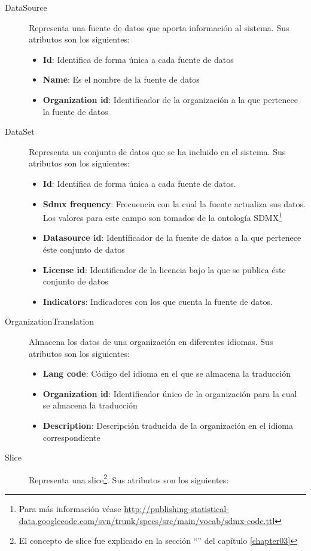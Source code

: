 \begin{description}
\begin{itemize}
		\end{itemize}
	\item[DataSource]  Representa una fuente de datos que aporta información al sistema.  Sus atributos son los siguientes:
		\begin{itemize}
			\item \textbf{Id}:  Identifica de forma única a cada fuente de datos
			\item \textbf{Name}:  Es el nombre de la fuente de datos
			\item \textbf{Organization id}:  Identificador de la organización a la que pertenece la fuente de datos
		\end{itemize}
	\item[DataSet]  Representa un conjunto de datos que se ha incluido en el sistema.  Sus atributos son los siguientes:
		\begin{itemize}
			\item \textbf{Id}:  Identifica de forma única a cada fuente de datos.
			\item \textbf{Sdmx frequency}:  Frecuencia con la cual la fuente actualiza sus datos.  Los valores para este campo son tomados de la ontología SDMX\footnote{Para más información véase \url{http://publishing-statistical-data.googlecode.com/svn/trunk/specs/src/main/vocab/sdmx-code.ttl}}
			\item \textbf{Datasource id}:  Identificador de la fuente de datos a la que pertenece éste conjunto de datos
			\item \textbf{License id}:  Identificador de la licencia bajo la que se publica éste conjunto de datos
			\item \textbf{Indicators}: Indicadores con los que cuenta la fuente de datos.
		\end{itemize}
	\item[OrganizationTranslation]  Almacena los datos de una organización en diferentes idiomas.  Sus atributos son los siguientes:
		\begin{itemize}
			\item \textbf{Lang code}:  Código del idioma en el que se almacena la traducción
			\item \textbf{Organization id}:  Identificador único de la organización para la cual se almacena la traducción
			\item \textbf{Description}:  Descripción traducida de la organización en el idioma correspondiente
		\end{itemize}
	\item[Slice]  Representa una slice\footnote{El concepto de slice fue explicado en la sección ``'' del capítulo \ref{chapter03}}.  Sus atributos son los siguientes:

\end{description}
